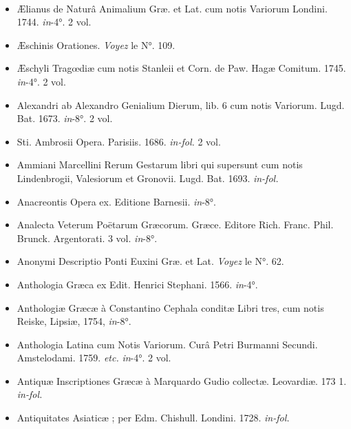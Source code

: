 \documentclass[a4paper, 11pt, oneside, polutonikogreek, french]{article}
\begin{document}
\paragraph{}
\begin{itemize}
    \item Ælianus de Naturâ Animalium Græ. et Lat. cum notis Variorum Londini. 1744. \emph{in}-4°. 2 vol.

    \item Æschinis Orationes. \emph{Voyez} le N°. 109.

    \item Æschyli Tragœdiæ cum notis Stanleii et Corn. de Paw. Hagæ Comitum. 1745. \emph{in}-4°. 2 vol.

    \item Alexandri ab Alexandro Genialium Dierum, lib. 6 cum notis Variorum. Lugd. Bat. 1673. \emph{in}-8°. 2 vol.

    \item Sti. Ambrosii Opera. Parisiis. 1686. \emph{in-fol.} 2 vol.

    \item Ammiani Marcellini Rerum Gestarum libri qui supersunt cum notis Lindenbrogii, Valesiorum et Gronovii. Lugd. Bat. 1693. \emph{in-fol.}

    \item Anacreontis Opera ex. Editione Barnesii. \emph{in}-8°.

    \item Analecta Veterum Poëtarum Græcorum. Græce. Editore Rich. Franc. Phil. Brunck. Argentorati. 3 vol. \emph{in}-8°.

    \item Anonymi Descriptio Ponti Euxini Græ. et Lat. \emph{Voyez} le N°. 62.

    \item Anthologia Græca ex Edit. Henrici Stephani. 1566. \emph{in}-4°.

    \item Anthologiæ Græcæ à Constantino Cephala conditæ Libri tres, cum notis Reiske, Lipsiæ, 1754, \emph{in}-8°.

    \item Anthologia Latina cum Notis Variorum. Curâ Petri Burmanni Secundi. Amstelodami. 1759. \emph{etc.} \emph{in}-4°. 2 vol.

    \item Antiquæ Inscriptiones Græcæ à Marquardo Gudio collectæ. Leovardiæ. 173 1. \emph{in-fol.}

    \item Antiquitates Asiaticæ ; per Edm. Chishull. Londini. 1728. \emph{in-fol.}


\end{itemize}
\end{document}
